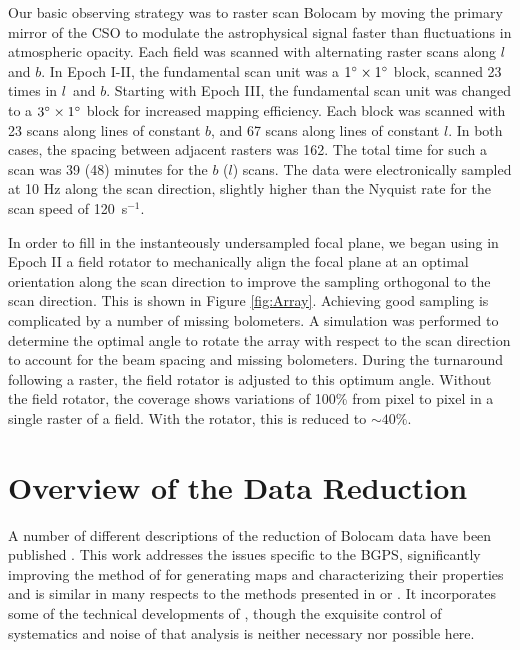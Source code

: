 \documentclass{emulateapj}
\newcommand{\lon}{\ensuremath{l}}
\begin{document}
Our basic observing strategy was to raster scan Bolocam by moving the
primary mirror of the CSO to modulate the astrophysical signal faster
than fluctuations in atmospheric opacity.  Each field was scanned with
alternating raster scans along $l$ and $b$.  In Epoch I-II, the
fundamental scan unit was a $1\mbox{$^\circ$} \times 1\mbox{$^\circ$}$ block, scanned
23 times in \lon\ and $b$.  Starting with Epoch III, the fundamental
scan unit was changed to a $3\mbox{$^\circ$} \times 1\mbox{$^\circ$}$ block for
increased mapping efficiency.  Each block was scanned with 23 scans
along lines of constant $b$, and 67 scans along lines of constant $l$.
In both cases, the spacing between adjacent rasters was 162\arcsec.
The total time for such a scan was 39 (48) minutes for the $b$ ($l$)
scans.  The data were electronically sampled at 10 Hz along the scan
direction, slightly higher than the Nyquist rate for the scan speed of
120\arcsec\ s$^{-1}$.

In order to fill in the instanteously undersampled focal plane, we
began using in Epoch II a field rotator to mechanically align the
focal plane at an optimal orientation along the scan direction to
improve the sampling orthogonal to the scan direction.  This is shown
in Figure \ref{fig:Array}.  Achieving good sampling is complicated by
a number of missing bolometers.  A simulation was performed to
determine the optimal angle to rotate the array with respect to the
scan direction to account for the beam spacing and missing bolometers.
During the turnaround following a raster, the field rotator is
adjusted to this optimum angle.
Without the field rotator, the coverage shows variations of 100\% from
pixel to pixel in a single raster of a field.  With the rotator, this
is reduced to $\sim40\%$.

\section{Overview of the Data Reduction}
\label{sec:Overview}

A number of different descriptions of the reduction of Bolocam data
have been published \citep{laurent05,enoch06,sayers09}.  This work
addresses the issues specific to the BGPS, significantly improving the
method of \citet{enoch06} for generating maps and characterizing their
properties and is similar in many respects to the methods presented in
\citet{cotton09} or \citet{kovacs08}.  It incorporates some of the
technical developments of \citet{sayers09}, though the exquisite
control of systematics and noise of that analysis is neither necessary
nor possible here.
\end{document}
